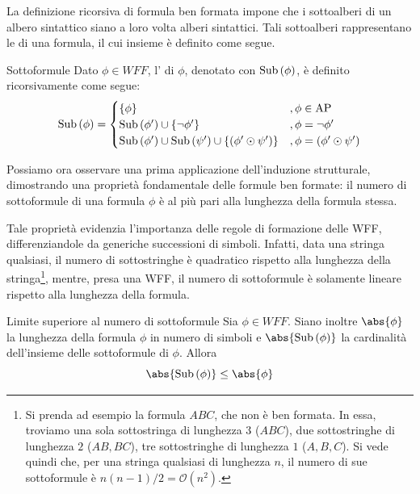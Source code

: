 La definizione ricorsiva di formula ben formata impone che i sottoalberi di un albero sintattico siano a loro volta alberi sintattici.
Tali sottoalberi rappresentano le  di una formula, il cui insieme è definito come segue.

\begin{definition}{Sottoformule}
  Dato \(\phi \in WFF\), l' di \(\phi\), denotato con \(\operatorname{Sub}\left(\phi\right)\), è definito ricorsivamente come segue:
  \[\Sub{\phi} = \begin{cases}
    \{\phi\} & ,\phi \in \AP\\
    \Sub{\phi'} \cup \{\neg \phi'\} & ,\phi = \neg \phi'\\
    \Sub{\phi'} \cup \Sub{\psi'} \cup \{(\phi' \odot \psi')\} & ,\phi = (\phi' \odot \psi')
  \end{cases}
  \]
\end{definition}

Possiamo ora osservare una prima applicazione dell'induzione strutturale, dimostrando una proprietà fondamentale delle formule ben formate: il numero di sottoformule di una formula \(\phi\) è al più pari alla lunghezza della formula stessa.

\begin{note}{}
  Tale proprietà evidenzia l'importanza delle regole di formazione delle WFF, differenziandole da generiche successioni di simboli.
  Infatti, data una stringa qualsiasi, il numero di sottostringhe è quadratico rispetto alla lunghezza della stringa\footnote{Si prenda ad esempio la formula \(ABC\), che non è ben formata. In essa, troviamo una sola sottostringa di lunghezza \(3\) (\(ABC\)), due sottostringhe di lunghezza \(2\) (\(AB,BC\)), tre sottostringhe di lunghezza \(1\) (\(A,B,C\)). Si vede quindi che, per una stringa qualsiasi di lunghezza \(n\), il numero di sue sottoformule è \(n(n-1)/2=\mathcal{O}(n^{2})\).}, mentre, presa una WFF, il numero di sottoformule è solamente lineare rispetto alla lunghezza della formula.
\end{note}

\begin{proposition}[namedlabel={prop:subformula-upperbound}{Limite superiore al numero di sottoformule}]{Limite superiore al numero di sottoformule}
  Sia \(\phi \in WFF\). Siano inoltre \(\abs{\phi}\) la lunghezza della formula \(\phi\) in numero di simboli e \(\abs{\Sub{\phi}}\) la cardinalità dell'insieme delle sottoformule di \(\phi\). Allora
  \[\abs{\Sub{\phi}}\leq \abs{\phi}\]
\end{proposition}

